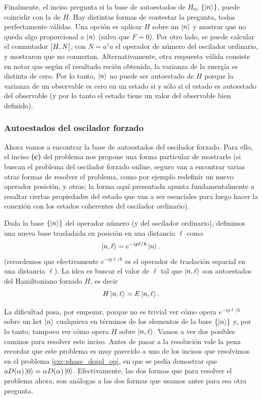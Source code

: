\documentclass[10pt, a4paper]{article}
\numberwithin{equation}{subsection}
\begin{document}
Finalmente, el inciso pregunta si la base de autoestados de $H_0$,
$\set{\ket{n}}$, puede coincidir con la de $H$. Hay distintas formas de
contestar la pregunta, todas perfectamente válidas. Una opción es aplicar $H$
sobre un $\ket{n}$ y mostrar que no queda algo proporcional a $\ket{n}$ (salvo
que $F = 0$). Por otro lado, se puede calcular el conmutador $\comm{H}{N}$,
con $N = a^\dagger a$ el operador de número del oscilador ordinario, y
mostraron que no conmutan. Alternativamente, otra respuesta válida consiste en
notar que según el resultado recién obtenido, la varianza de la energía es
distinta de cero. Por lo tanto, $\ket{n}$ no puede ser autoestado de $H$
porque la varianza de un observable es cero en un estado si y sólo si el estado
es autoestado del observable (y por lo tanto el estado tiene un valor del
observable bien definido).

\subsubsection{Autoestados del oscilador forzado}
Ahora vamos a encontrar la base de autoestados del oscilador forzado. Para
ello, el inciso \textbf{(c)} del problema nos propone una forma particular de
mostrarlo (si buscan el problema del oscilador forzado online, seguro van a
encontrar varias otras formas de resolver el problema, como por ejemplo
redefinir un nuevo operador posición, y otras; la forma aquí presentada apunta
fundamentalmente a resaltar ciertas propiedades del estado que van a ser
esenciales para luego hacer la conexión con los estados coherentes del
oscilador ordinario).

Dada la base $\set{\ket{n}}$ del operador número (y del oscilador ordinario),
definimos una nueva base trasladada en posición en una distancia $\ell$ como
\begin{equation}
  \ket{n,\ell} = e^{-ip\ell/\hbar}\ket{n}.
\end{equation}
(recordemos que efectivamente $e^{-ip\ell/\hbar}$ es el operador de traslación
espacial en una distancia $\ell$). La idea es buscar el valor de $\ell$ tal que
$\ket{n,\ell}$ son autoestados del Hamiltoniano forzado $H$, es decir
\begin{equation}
  H\ket{n,\ell} = E\ket{n,\ell}.
\end{equation}

La dificultad pasa, por empezar, porque no es trivial ver cómo opera
$e^{-ip\ell/\hbar}$ sobre un ket $\ket{n}$ cualquiera en términos de los
elementos de la base $\set{\ket{n}}$ y, por lo tanto, tampoco ver cómo
opera $H$ sobre $\ket{n,\ell}$. Vamos a ver dos posibles caminos para resolver
este inciso. Antes de pasar a la resolución vale la pena recordar que este
problema es muy parecido a uno de los incisos que resolvimos en el problema
\ref{exc:phase_despl_op}, en que se pedía demostrar que $aD(\alpha)\ket{0} =
\alpha D(\alpha)\ket{0}$. Efectivamente, las dos formas que para resolver el
problema ahora, son análogas a las dos formas que usamos antes para esa otra
pregunta.
\end{document}

